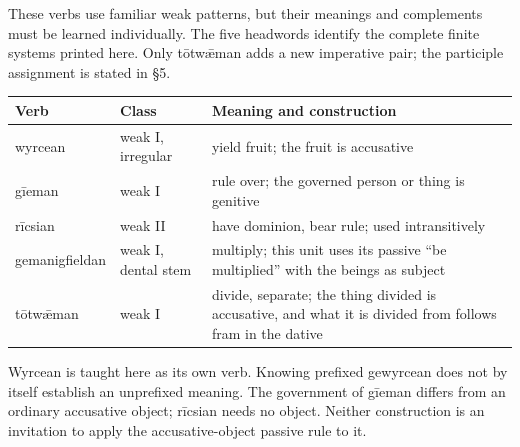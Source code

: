 These verbs use familiar weak patterns, but their meanings and complements must be learned individually. The five headwords identify the complete finite systems printed here. Only tōtwǣman adds a new imperative pair; the participle assignment is stated in §5.

\par\begingroup
\fontsize{10.5}{13.2}\selectfont
\setlength{\LTleft}{0pt}\setlength{\LTright}{\fill}
\noindent
\begin{tabular}{@{}>{\raggedright\arraybackslash}p{26mm}>{\raggedright\arraybackslash}p{23mm}>{\raggedright\arraybackslash}p{69.37mm}@{}}
\toprule
\textbf{Verb} & \textbf{Class} & \textbf{Meaning and construction} \\
\midrule
wyrcean & weak I, irregular & yield fruit; the fruit is accusative \\
gīeman & weak I & rule over; the governed person or thing is genitive \\
rīcsian & weak II & have dominion, bear rule; used intransitively \\
gemanigfieldan & weak I, dental stem & multiply; this unit uses its passive “be multiplied” with the beings as subject \\
tōtwǣman & weak I & divide, separate; the thing divided is accusative, and what it is divided from follows fram in the dative \\
\bottomrule
\end{tabular}
\par\endgroup

Wyrcean is taught here as its own verb. Knowing prefixed gewyrcean does not by itself establish an unprefixed meaning. The government of gīeman differs from an ordinary accusative object; rīcsian needs no object. Neither construction is an invitation to apply the accusative-object passive rule to it.

